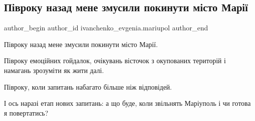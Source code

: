  
 
 
 
 

\subsection{Півроку назад мене змусили покинути місто Марії}
\label{sec:16_09_2022.fb.ivanchenko_evgenia.mariupol.1.p_vroku_nazad_mene_z}

\ifcmt
 author_begin
   author_id ivanchenko_evgenia.mariupol
 author_end
\fi

Півроку назад мене змусили покинути місто Марії.

Півроку емоційних гойдалок, очікувань вісточок з окупованих територій і
намагань зрозуміти як жити далі.

Півроку, коли запитань набагато більше ніж відповідей. 

І ось наразі етап нових запитань: а що буде, коли звільнять Маріуполь і чи
готова я повертатись?
